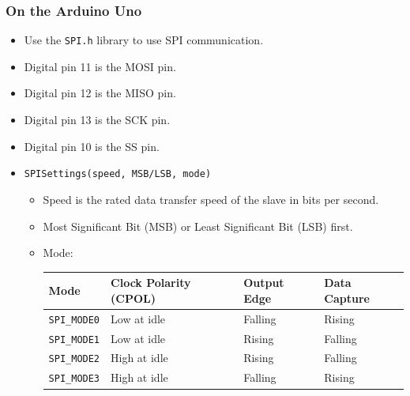 \documentclass[11pt]{article}
\begin{document}
\subsubsection{On the Arduino Uno}
\label{sec:org25fa67a}
\begin{itemize}
\item Use the \texttt{SPI.h} library to use SPI communication.
\item Digital pin 11 is the MOSI pin.
\item Digital pin 12 is the MISO pin.
\item Digital pin 13 is the SCK pin.
\item Digital pin 10 is the SS pin.
\item \texttt{SPISettings(speed, MSB/LSB, mode)}
\begin{itemize}
\item Speed is the rated data transfer speed of the slave in bits per second.
\item Most Significant Bit (MSB) or Least Significant Bit (LSB) first.
\item Mode:
\begin{center}
\begin{tabular}{llll}
Mode & Clock Polarity (CPOL) & Output Edge & Data Capture\\
\hline
\texttt{SPI\_MODE0} & Low at idle & Falling & Rising\\
\texttt{SPI\_MODE1} & Low at idle & Rising & Falling\\
\texttt{SPI\_MODE2} & High at idle & Rising & Falling\\
\texttt{SPI\_MODE3} & High at idle & Falling & Rising\\
\end{tabular}
\end{center}
\end{itemize}
\end{itemize}
\end{document}

